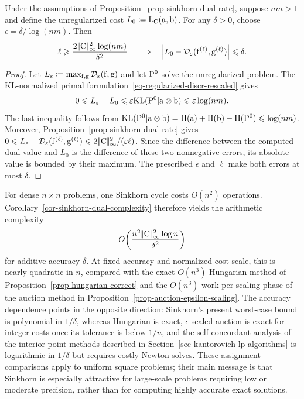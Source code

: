 \begin{cor}\label{cor-sinkhorn-dual-complexity}
	Under the assumptions of Proposition~\ref{prop-sinkhorn-dual-rate}, suppose $nm>1$ and define the unregularized cost $L_0\eqdef\MKD_\C(\a,\b)$. For any $\delta>0$, choose $\epsilon=\delta/\log(nm)$. Then
	\[
		\ell\geq \frac{2\norm{\C}_\infty^2\log(nm)}{\delta^2}
		\quad\Longrightarrow\quad
		\abs{L_0-\Dd_\epsilon(\fD^{(\ell)},\gD^{(\ell)})}\leq\delta.
	\]
\end{cor}
\begin{proof}
	Let $L_\epsilon\eqdef\max_{\fD,\gD}\Dd_\epsilon(\fD,\gD)$ and let $\P^0$ solve the unregularized problem. The KL-normalized primal formulation~\eqref{eq-regularized-discr-rescaled} gives
	\[
		0\leq L_\epsilon-L_0
		\leq \epsilon\KLD(\P^0|\a\otimes\b)
		\leq \epsilon\log(nm).
	\]
	The last inequality follows from $\KLD(\P^0|\a\otimes\b)=\HD(\a)+\HD(\b)-\HD(\P^0)\leq\log(nm)$.
	Moreover, Proposition~\ref{prop-sinkhorn-dual-rate} gives $0\leq L_\epsilon-\Dd_\epsilon(\fD^{(\ell)},\gD^{(\ell)})\leq2\norm{\C}_\infty^2/(\epsilon\ell)$. Since the difference between the computed dual value and $L_0$ is the difference of these two nonnegative errors, its absolute value is bounded by their maximum. The prescribed $\epsilon$ and $\ell$ make both errors at most $\delta$.
\end{proof}

For dense $n\times n$ problems, one Sinkhorn cycle costs $O(n^2)$ operations. Corollary~\ref{cor-sinkhorn-dual-complexity} therefore yields the arithmetic complexity
\[
	O\!\left(\frac{n^2\norm{\C}_\infty^2\log n}{\delta^2}\right)
\]
for additive accuracy $\delta$. At fixed accuracy and normalized cost scale, this is nearly quadratic in $n$, compared with the exact $O(n^3)$ Hungarian method of Proposition~\ref{prop-hungarian-correct} and the $O(n^3)$ work per scaling phase of the auction method in Proposition~\ref{prop-auction-epsilon-scaling}. The accuracy dependence points in the opposite direction: Sinkhorn's present worst-case bound is polynomial in $1/\delta$, whereas Hungarian is exact, $\epsilon$-scaled auction is exact for integer costs once its tolerance is below $1/n$, and the self-concordant analysis of the interior-point methods described in Section~\ref{sec-kantorovich-lp-algorithms} is logarithmic in $1/\delta$ but requires costly Newton solves. These assignment comparisons apply to uniform square problems; their main message is that Sinkhorn is especially attractive for large-scale problems requiring low or moderate precision, rather than for computing highly accurate exact solutions.


